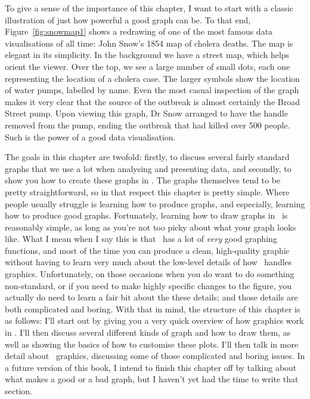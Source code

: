 To give a sense of the importance of this chapter, I want to start with a classic illustration of just how powerful a good graph can be. To that end, Figure~\ref{fig:snowmap1} shows a redrawing of one of the most famous data visualisations of all time: John Snow's 1854 map of cholera deaths. The map is elegant in its simplicity. In the background we have a street map, which helps orient the viewer. Over the top, we see a large number of small dots, each one representing the location of a cholera case. The larger symbols show the location of water pumps, labelled by name. Even the most casual inspection of the graph makes it very clear that the source of the outbreak is almost certainly the Broad Street pump. Upon viewing this graph, Dr Snow arranged to have the handle removed from the pump, ending the outbreak that had killed over 500 people. Such is the power of a good data visualisation.


The goals in this chapter are twofold: firstly, to discuss several fairly standard graphs that we use a lot when analysing and presenting data, and secondly, to show you how to create these graphs in \R. The graphs themselves tend to be pretty straightforward, so in that respect this chapter is pretty simple. Where people usually struggle is learning how to produce graphs, and especially, learning how to produce good graphs. Fortunately, learning how to draw graphs in \R\ is reasonably simple, as long as you're not too picky about what your graph looks like. What I mean when I say this is that \R\ has a lot of {\it very} good graphing functions, and most of the time you can produce a clean, high-quality graphic without having to learn very much about the low-level details of how \R\ handles graphics. Unfortunately, on those occasions when you do want to do something non-standard, or if you need to make highly specific changes to the figure, you actually do need to learn a fair bit about the these details; and those details are both complicated and boring. With that in mind, the structure of this chapter is as follows: I'll start out by giving you a very quick overview of how graphics work in \R. I'll then discuss several different kinds of graph and how to draw them, as well as showing the basics of how to customise these plots. I'll then talk in more detail about \R\ graphics, discussing some of those complicated and boring issues. In a future version of this book, I intend to finish this chapter off by talking about what makes a good or a bad graph, but I haven't yet had the time to write that section.

